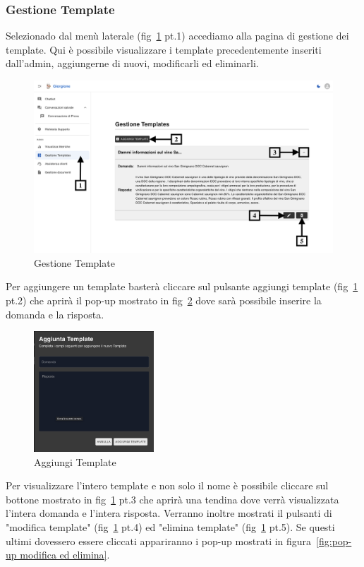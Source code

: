 \subsubsection{Gestione Template}
Selezionado dal menù laterale (fig~\ref{fig:Template} pt.1) accediamo alla pagina di gestione dei template. Qui è possibile visualizzare i template precedentemente inseriti dall'admin, aggiungerne di nuovi, modificarli ed eliminarli.
\begin{figure}[h!]
    \centering
    \includegraphics[width=\textwidth]{./img/GestioneTemplate.png}
    \caption{Gestione Template}
    \label{fig:Template}
\end{figure}
Per aggiungere un template basterà cliccare sul pulsante aggiungi template (fig~\ref{fig:Template} pt.2) che aprirà il pop-up mostrato in fig~\ref{fig:addTemplate} dove sarà possibile inserire la domanda e la risposta.
\begin{figure}[h!]
    \centering
    \includegraphics[width=0.4\textwidth]{./img/AggiungiTemplate.png}
    \caption{Aggiungi Template}
    \label{fig:addTemplate}
\end{figure}
Per visualizzare l'intero template e non solo il nome è possibile cliccare sul bottone mostrato in fig~\ref{fig:Template} pt.3 che aprirà una tendina dove verrà visualizzata l'intera domanda e l'intera risposta. Verranno inoltre mostrati il pulsanti di "modifica template" (fig~\ref{fig:Template} pt.4) ed "elimina template" (fig~\ref{fig:Template} pt.5). Se questi ultimi dovessero essere cliccati appariranno i pop-up mostrati in figura~\ref{fig:pop-up modifica ed elimina}.
